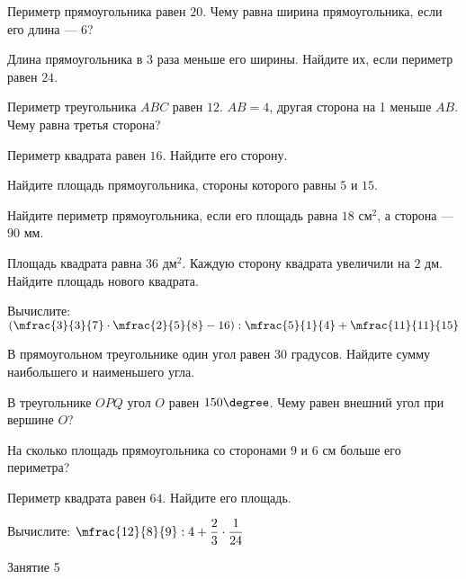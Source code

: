 \begin{class}[number=4]
	\begin{listofex}
		\item Периметр прямоугольника равен \( 20 \). Чему равна ширина прямоугольника, если его длина --- \( 6 \)?
		\item Длина прямоугольника в \( 3 \) раза меньше его ширины. Найдите их, если периметр равен \( 24 \).
		\item Периметр треугольника \( ABC \) равен \( 12 \). \( AB=4 \), другая сторона на 1 меньше \( AB \). Чему равна третья сторона?
		\item Периметр квадрата равен \( 16 \). Найдите его сторону.
		\item Найдите площадь прямоугольника, стороны которого равны \( 5 \) и \( 15 \).
		\item Найдите периметр прямоугольника, если его площадь равна \( 18 \) см\( ^2 \), а сторона --- \( 90 \) мм.
		\item Площадь квадрата равна \( 36 \) дм\( ^2 \). Каждую сторону квадрата увеличили на \( 2 \) дм. Найдите площадь нового квадрата.
		\item Вычислите: \quad \( \left( \mfrac{3}{3}{7}\cdot\mfrac{2}{5}{8}-16 \right):\mfrac{5}{1}{4}+\mfrac{11}{11}{15}  \)
	\end{listofex}
\end{class}

\begin{homework}[number=2]
	\begin{listofex}
		\item В прямоугольном треугольнике один угол равен \( 30 \) градусов. Найдите сумму наибольшего и наименьшего угла. 
		\item В треугольнике \( OPQ \) угол \( O \) равен \( 150\degree \). Чему равен внешний угол при вершине \( O \)?
		\item На сколько площадь прямоугольника со сторонами \( 9 \) и \( 6 \) см больше его периметра?
		\item Периметр квадрата равен \( 64 \). Найдите его площадь.
		\item Вычислите: \quad \( \mfrac{12}{8}{9}:4+\dfrac{2}{3}\cdot\dfrac{1}{24} \)
	\end{listofex}
\end{homework}

\begin{class}[number=5]
	\begin{listofex}
		\item Занятие 5
	\end{listofex}
\end{class}

